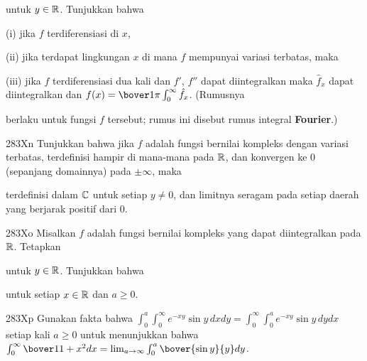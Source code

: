 {\noindent untuk $y\in\Bbb R$.   Tunjukkan bahwa

\quad (i) jika $f$ terdiferensiasi di $x$,


\quad (ii) jika terdapat lingkungan $x$ di mana $f$ mempunyai variasi terbatas, maka


\quad (iii) jika $f$ terdiferensiasi dua kali dan $f'$, $f''$ dapat diintegralkan
maka $\hat f_x$ dapat diintegralkan dan
$f(x)=\bover1{\pi}\int_0^{\infty}\hat f_x$.
(Rumusnya


\noindent berlaku untuk fungsi $f$ tersebut; rumus ini disebut rumus integral
{\bf Fourier}.)

\spheader 283Xn Tunjukkan bahwa jika $f$ adalah fungsi bernilai kompleks
dengan variasi terbatas, terdefinisi hampir di mana-mana pada $\Bbb R$, dan
konvergen ke $0$ (sepanjang domainnya) pada $\pm\infty$, maka


\noindent terdefinisi dalam $\Bbb C$ untuk setiap $y\ne 0$, dan limitnya
seragam pada setiap daerah yang berjarak positif dari $0$.

\spheader 283Xo Misalkan $f$ adalah fungsi bernilai kompleks
yang dapat diintegralkan pada $\Bbb R$.   Tetapkan


\noindent untuk $y\in\Bbb R$.   Tunjukkan bahwa


\noindent untuk setiap $x\in\Bbb R$ dan $a\ge 0$.

\spheader 283Xp Gunakan fakta bahwa
$\int_{0}^a\int_{0}^{\infty}e^{-xy}\sin
y\,dxdy=\int_{0}^{\infty}\int_{0}^ae^{-xy}\sin y\,dydx$ setiap kali
$a\ge 0$ untuk menunjukkan bahwa 
$\int_0^{\infty}\bover1{1+x^2}dx=\lim_{a\to\infty}\int_0^a\bover{\sin y}{y}dy$.

}
